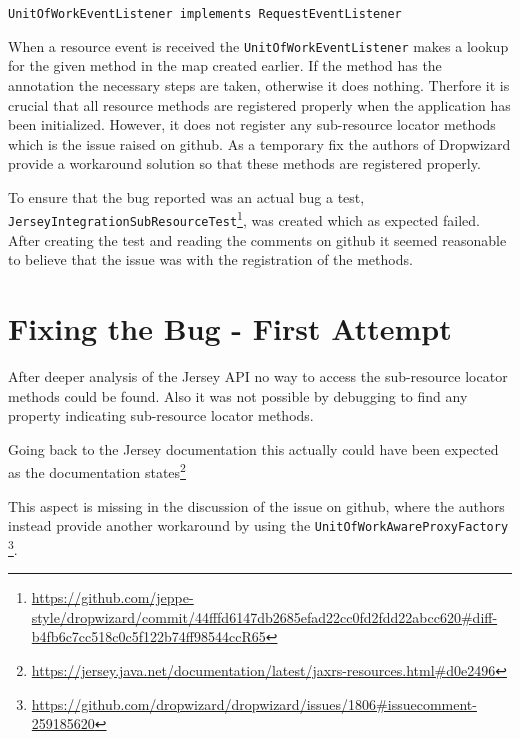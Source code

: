 \documentclass[11pt]{article}
\begin{document}
\begin{verbatim}
UnitOfWorkEventListener implements RequestEventListener
\end{verbatim}

When a resource event is received the \texttt{UnitOfWorkEventListener} makes a lookup for the given method in the map created earlier. If the method has the annotation the necessary steps are taken, otherwise it does nothing. Therfore it is crucial that all resource methods are registered properly when the application has been initialized. However, it does not register any sub-resource locator methods which is the issue raised on github. As a temporary fix the authors of Dropwizard provide a workaround solution so that these methods are registered properly.

To ensure that the bug reported was an actual bug a test, \texttt{JerseyIntegrationSubResourceTest}\footnote{\url{https://github.com/jeppe-style/dropwizard/commit/44fffd6147db2685efad22cc0fd2fdd22abcc620#diff-b4fb6c7cc518c0c5f122b74ff98544ccR65}}, was created which as expected failed. After creating the test and reading the comments on github it seemed reasonable to believe that the issue was with the registration of the methods.

\section{Fixing the Bug - First Attempt}
After deeper analysis of the Jersey API no way to access the sub-resource locator methods could be found. Also it was not possible by debugging to find any property indicating sub-resource locator methods.

Going back to the Jersey documentation this actually could have been expected as the documentation states\footnote{\url{https://jersey.java.net/documentation/latest/jaxrs-resources.html#d0e2496}}


This aspect is missing in the discussion of the issue on github, where the authors instead provide another workaround by using the \texttt{UnitOfWorkAwareProxyFactory} \footnote{\url{https://github.com/dropwizard/dropwizard/issues/1806#issuecomment-259185620}}.
\end{document}
